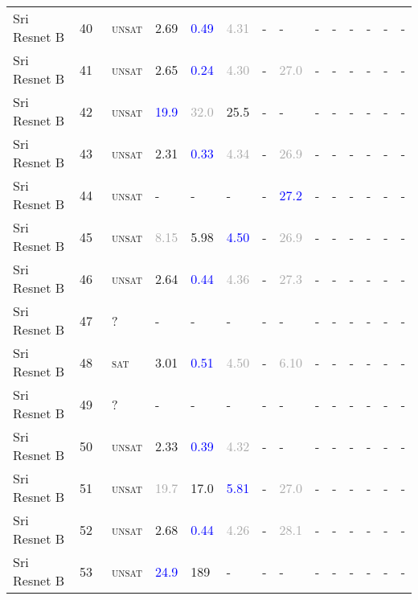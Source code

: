 \begin{center}
{\begin{longtable}{@{}llllllllllllll@{}}
Sri Resnet B & 40 & ~\textsc{unsat} & \textcolor{second}{2.69} & \textcolor{blue}{0.49} & \textcolor{darkgray}{4.31} & - & - & - & - & - & - & - & - \\
Sri Resnet B & 41 & ~\textsc{unsat} & \textcolor{second}{2.65} & \textcolor{blue}{0.24} & \textcolor{darkgray}{4.30} & - & \textcolor{darkgray}{27.0} & - & - & - & - & - & - \\
Sri Resnet B & 42 & ~\textsc{unsat} & \textcolor{blue}{19.9} & \textcolor{darkgray}{32.0} & \textcolor{second}{25.5} & - & - & - & - & - & - & - & - \\
Sri Resnet B & 43 & ~\textsc{unsat} & \textcolor{second}{2.31} & \textcolor{blue}{0.33} & \textcolor{darkgray}{4.34} & - & \textcolor{darkgray}{26.9} & - & - & - & - & - & - \\
Sri Resnet B & 44 & ~\textsc{unsat} & - & - & - & - & \textcolor{blue}{27.2} & - & - & - & - & - & - \\
Sri Resnet B & 45 & ~\textsc{unsat} & \textcolor{darkgray}{8.15} & \textcolor{second}{5.98} & \textcolor{blue}{4.50} & - & \textcolor{darkgray}{26.9} & - & - & - & - & - & - \\
Sri Resnet B & 46 & ~\textsc{unsat} & \textcolor{second}{2.64} & \textcolor{blue}{0.44} & \textcolor{darkgray}{4.36} & - & \textcolor{darkgray}{27.3} & - & - & - & - & - & - \\
Sri Resnet B & 47 & ~? & - & - & - & - & - & - & - & - & - & - & - \\
Sri Resnet B & 48 & ~\textsc{sat} & \textcolor{second}{3.01} & \textcolor{blue}{0.51} & \textcolor{darkgray}{4.50} & - & \textcolor{darkgray}{6.10} & - & - & - & - & - & - \\
Sri Resnet B & 49 & ~? & - & - & - & - & - & - & - & - & - & - & - \\
Sri Resnet B & 50 & ~\textsc{unsat} & \textcolor{second}{2.33} & \textcolor{blue}{0.39} & \textcolor{darkgray}{4.32} & - & - & - & - & - & - & - & - \\
Sri Resnet B & 51 & ~\textsc{unsat} & \textcolor{darkgray}{19.7} & \textcolor{second}{17.0} & \textcolor{blue}{5.81} & - & \textcolor{darkgray}{27.0} & - & - & - & - & - & - \\
Sri Resnet B & 52 & ~\textsc{unsat} & \textcolor{second}{2.68} & \textcolor{blue}{0.44} & \textcolor{darkgray}{4.26} & - & \textcolor{darkgray}{28.1} & - & - & - & - & - & - \\
Sri Resnet B & 53 & ~\textsc{unsat} & \textcolor{blue}{24.9} & \textcolor{second}{189} & - & - & - & - & - & - & - & - & - \\

\end{longtable}}
\end{center}
